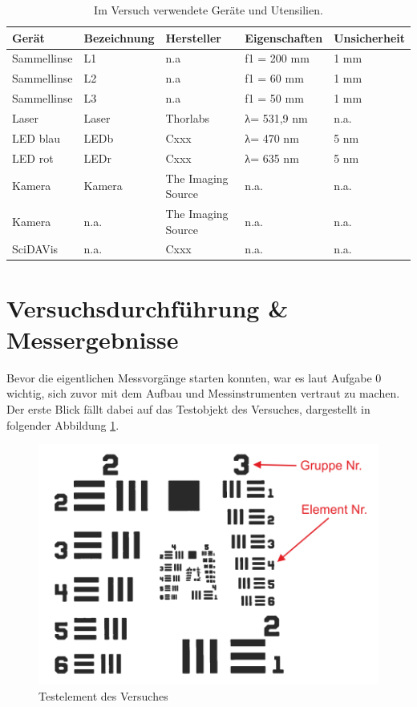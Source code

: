 \documentclass[12pt,a4paper,twoside]{article}
\begin{document}
    \begin{table}[H]
        \centering
        \caption{Im Versuch verwendete Geräte und Utensilien.}
        \label{tab:geraete}
        \begin{tabular}{| l | l | l | l | l |}
            \hline
            Gerät   & Bezeichnung  & Hersteller  & Eigenschaften  & Unsicherheit \\
            \hline
            Sammellinse & L1 & {n.a} & f1 = 200 mm & 1 mm \\
            Sammellinse & L2 & {n.a} & f1 = 60 mm  & 1 mm \\
            Sammellinse & L3 & {n.a} & f1 = 50 mm  & 1 mm \\
            Laser & Laser & Thorlabs & λ= 531,9 nm & {n.a.} \\
            LED blau & LEDb & Cxxx & λ= 470 nm & 5 nm \\
            LED rot & LEDr & Cxxx & λ= 635 nm & 5 nm \\
            Kamera & Kamera & The Imaging Source & {n.a.} & {n.a.}\\
            Kamera & {n.a.} & The Imaging Source & {n.a.} & {n.a.}\\
            SciDAVis & {n.a.} & Cxxx & {n.a.} & {n.a.} \\
            \hline
        \end{tabular}
    \end{table}


\section{Versuchsdurchführung \& Messergebnisse} %

Bevor die eigentlichen Messvorgänge starten konnten, war es laut Aufgabe 0 wichtig, sich zuvor mit dem Aufbau und Messinstrumenten vertraut zu machen. 
Der erste Blick fällt dabei auf das Testobjekt des Versuches, dargestellt in folgender Abbildung \ref{fig:Testelement}.

\begin{figure}[H]
    \centering
    \includegraphics[width=0.6\linewidth]{nudes/Testelement.png}
    \caption{Testelement des Versuches \cite{teachcenter2}}
    \label{fig:Testelement}
\end{figure}
\end{document}
